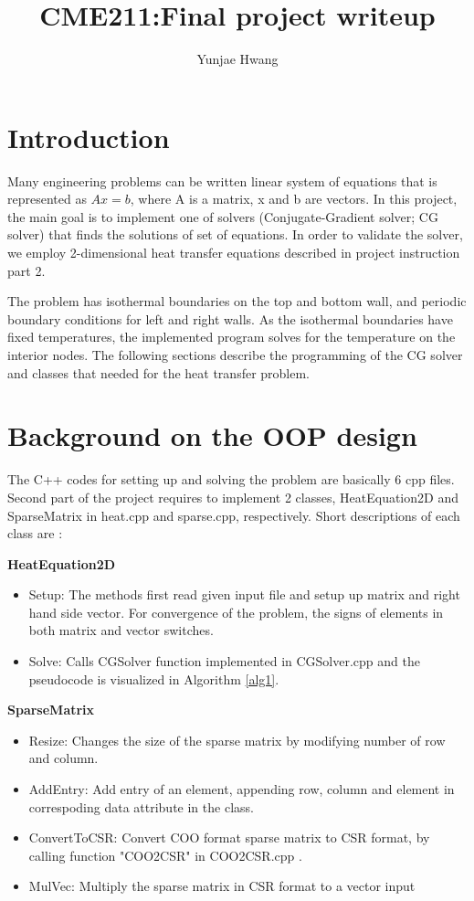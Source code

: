 \documentclass{article}
\title{CME211:Final project writeup}
\author{Yunjae Hwang}
\begin{document}
\maketitle

\section*{Introduction}
Many engineering problems can be written linear system of equations
 that is represented as $Ax=b$, where A is a matrix, x and b are vectors.
In this project, the main goal is to implement one of solvers 
(Conjugate-Gradient solver; CG solver) 
that finds the solutions of set of equations.
In order to validate the solver, we employ 2-dimensional heat transfer
 equations described in project instruction part 2.

The problem has isothermal boundaries on the top and bottom wall,
 and periodic boundary conditions for left and right walls.
As the isothermal boundaries have fixed temperatures,
 the implemented program solves for the temperature on the interior nodes.
The following sections describe the programming of the CG solver
 and classes that needed for the heat transfer problem.

\section*{Background on the OOP design}
The C++ codes for setting up and solving the problem are basically 6 cpp files.
Second part of the project requires to implement 2 classes,
 HeatEquation2D and SparseMatrix in heat.cpp and sparse.cpp, respectively.
Short descriptions of each class are :

{\bf HeatEquation2D}
\begin{itemize}
    \item Setup: The methods first read given input file
     and setup up matrix and right hand side vector.
     For convergence of the problem, the signs of elements
      in both matrix and vector switches.
    \item Solve: Calls CGSolver function implemented in CGSolver.cpp
     and the pseudocode is visualized in Algorithm \ref{alg1}.
\end{itemize}

{\bf SparseMatrix}
\begin{itemize}
    \item Resize: Changes the size of the sparse matrix
     by modifying number of row and column.
    \item AddEntry: Add entry of an element, appending row, column
     and element in correspoding data attribute in the class.
    \item ConvertToCSR: Convert COO format sparse matrix to CSR format,
     by calling function "COO2CSR" in COO2CSR.cpp .
    \item MulVec: Multiply the sparse matrix in CSR format to a vector input
\end{itemize}
\end{document}
